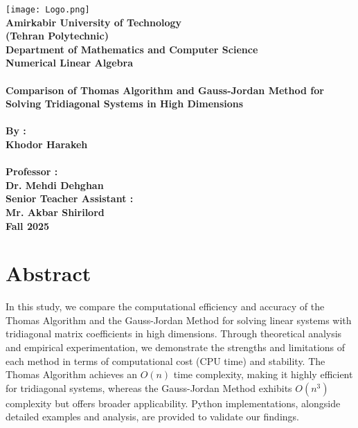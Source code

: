 \documentclass[a4paper,12pt]{article}
\begin{document}
\begin{titlepage}
    \centering
    \texttt{[image: Logo.png]} \\[1cm]
    \textbf{\large{Amirkabir University of Technology}} \\[0.5cm]
    \textbf{\large{(Tehran Polytechnic)}} \\[0.5cm]
    \textbf{\large{Department of Mathematics and Computer Science}} \\[0.5cm]
    \textbf{\large{Numerical Linear Algebra}} \\[0.5cm]
    \textbf{\Large{}} \\[0.5cm]
    \textbf{\Large{Comparison of Thomas Algorithm and Gauss-Jordan Method for Solving Tridiagonal Systems in High Dimensions}} \\[1cm]
    \textbf{\Large{}} \\[0.8cm]
    \textbf{\large{By :}} \\[0.2cm]
    \textbf{\large{Khodor Harakeh}} \\[1cm]
    \textbf{\Large{}} \\[0.2cm]
    \textbf{\large{Professor :}} \\[0.2cm]
    \textbf{\large{Dr. Mehdi Dehghan}} \\[1cm]
    \textbf{\large{Senior Teacher Assistant :}} \\[0.2cm]
    \textbf{\large{Mr. Akbar Shirilord}} \\[1cm]  
    \textbf{\large{Fall 2025}}
\end{titlepage}

\newpage
{}
\setcounter{page}{1}

\section*{Abstract}
In this study, we compare the computational efficiency and accuracy of the Thomas Algorithm and the Gauss-Jordan Method for solving linear systems with tridiagonal matrix coefficients in high dimensions. Through theoretical analysis and empirical experimentation, we demonstrate the strengths and limitations of each method in terms of computational cost (CPU time) and stability. The Thomas Algorithm achieves an \(O(n)\) time complexity, making it highly efficient for tridiagonal systems, whereas the Gauss-Jordan Method exhibits \(O(n^3)\) complexity but offers broader applicability. Python implementations, alongside detailed examples and analysis, are provided to validate our findings.
\end{document}
